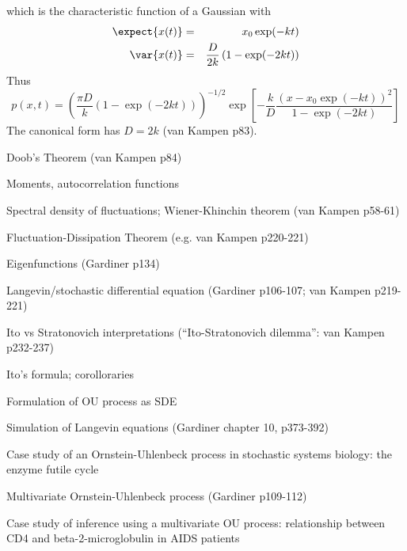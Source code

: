 \documentclass{beamer}
\begin{document}
\begin{frame}{}
\[\]
which is the characteristic function of a Gaussian with
\begin{eqnarray*}
\expect{x(t)} & = & x_0 \exp(-kt) \\
\var{x(t)} & = & \frac{D}{2k} \left( 1 - \exp(-2kt) \right)
\end{eqnarray*}
Thus
\[
p(x,t) = \left( \frac{\pi D}{k}(1-\exp(-2kt)) \right)^{-1/2} \exp \left[ -\frac{k}{D} \frac{(x - x_0 \exp(-kt))^2}{1-\exp(-2kt)} \right]
\]
The canonical form has $D=2k$ (van Kampen p83).
  \iteme
 \item Doob's Theorem (van Kampen p84)
 \item Moments, autocorrelation functions
 \item Spectral density of fluctuations; Wiener-Khinchin theorem (van Kampen p58-61)
 \item Fluctuation-Dissipation Theorem (e.g. van Kampen p220-221)
 \item Eigenfunctions (Gardiner p134)
 \item Langevin/stochastic differential equation (Gardiner p106-107; van Kampen p219-221)
  \itemb
  \item Ito vs Stratonovich interpretations (``Ito-Stratonovich dilemma'': van Kampen p232-237)
  \item Ito's formula; corolloraries
  \item Formulation of OU process as SDE
  \item Simulation of Langevin equations (Gardiner chapter 10, p373-392)
  \iteme
 \iteme
\end{frame}


\begin{frame}{}

\itemb
\item Case study of an Ornstein-Uhlenbeck process in stochastic systems biology: the enzyme futile cycle
\item Multivariate Ornstein-Uhlenbeck process (Gardiner p109-112)
\item Case study of inference using a multivariate OU process: relationship between CD4 and beta-2-microglobulin in AIDS patients
\iteme

\end{frame}
\end{document}
